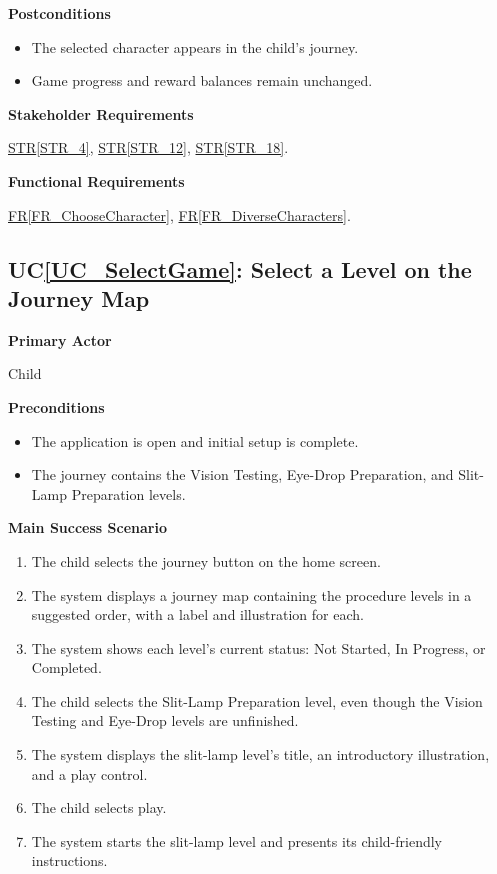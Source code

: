 \documentclass[10pt]{article}
\makeatletter
\newcommand{\strref}[1]{\hyperref[#1]{STR\ref*{#1}}}
\newcounter{ucnum} %
\newcommand{\ucheading}[1]{UC\ref*{#1}}
\newcommand{\termsecnum}{\ifnum\value{subsection}=0 \thesection\else\thesubsection\fi}
\newcommand{\termmark}[1]{%
  \hypertarget{term:#1}{}%
  \protected@write\@auxout{}{\string\newlabel{termsec:#1}{{\termsecnum}{\thepage}{}{}{}}}%
}
\newcommand{\rref}[1]{\hyperref[#1]{FR\ref*{#1}}}
\makeatother
\begin{document}
\textbf{Postconditions}
\begin{itemize}
    \item The selected character appears in the child's journey.
    \item \termmark{gameprogress}Game progress and reward balances remain unchanged.
\end{itemize}

\textbf{Stakeholder Requirements}

\strref{STR_4}, \strref{STR_12}, \strref{STR_18}.

\textbf{Functional Requirements}

\rref{FR_ChooseCharacter}, \rref{FR_DiverseCharacters}.

\label{UC_SelectGame}
\subsection{\ucheading{UC_SelectGame}: Select a Level on the Journey Map}

\textbf{Primary Actor}

Child

\textbf{Preconditions}
\begin{itemize}
    \item The application is open and initial setup is complete.
    \item The journey contains the Vision Testing, Eye-Drop Preparation,
    and Slit-Lamp Preparation levels.
\end{itemize}

\textbf{Main Success Scenario}
\begin{enumerate}
    \item The child selects the journey button on the home screen.
    \item The system displays a journey map containing the procedure
    levels in a suggested order, with a label and illustration for each.
    \item The system shows each level's current status: Not Started,
    In Progress, or Completed.
    \item The child selects the Slit-Lamp Preparation level, even
    though the Vision Testing and Eye-Drop levels are unfinished.
    \item The system displays the slit-lamp level's title, an
    introductory illustration, and a play control.
    \item The child selects play.
    \item The system starts the slit-lamp level and presents its
    child-friendly instructions.
\end{enumerate}
\end{document}
